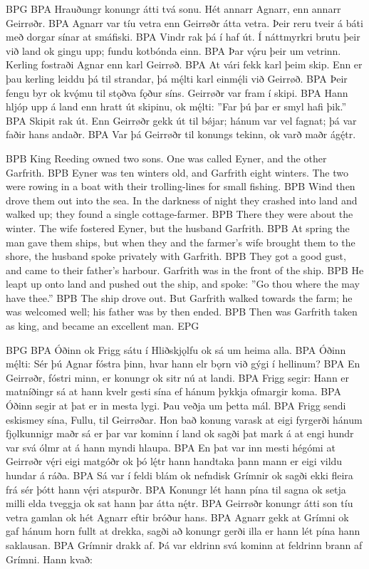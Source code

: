 BPG
BPA Hrauðungr konungr átti tvá sonu. Hét annarr Agnarr, enn annarr Geirrøðr.
BPA Agnarr var tíu vetra enn Geirrøðr átta vetra. Þeir reru tveir á báti með dorgar sínar at smáfiski.
BPA Vindr rak þá í haf út. Í náttmyrkri brutu þeir við land ok gingu upp; fundu kotbónda einn.
BPA Þar vǫ́ru þeir um vetrinn. Kerling fostraði Agnar enn karl Geirrøð.
BPA At vári fekk karl þeim skip. Enn er þau kerling leiddu þá til strandar, þá mę́lti karl einmę́li við Geirrøð.
BPA Þeir fengu byr ok kvǫ́mu til stǫðva fǫður síns. Geirrøðr var fram í skipi.
BPA Hann hljóp upp á land enn hratt út skipinu, ok mę́lti: ”Far þú þar er smyl hafi þik.”
BPA Skipit rak út. Enn Geirrøðr gekk út til bǿjar; hánum var vel fagnat; þá var faðir hans andaðr.
BPA Var þá Geirrøðr til konungs tekinn, ok varð maðr ágę́tr.

BPB King Reeding owned two sons. One was called Eyner, and the other Garfrith.
BPB Eyner was ten winters old, and Garfrith eight winters. The two were rowing in a boat with their trolling-lines for small fishing.
BPB Wind then drove them out into the sea. In the darkness of night they crashed into land and walked up; they found a single cottage-farmer.
BPB There they were about the winter. The wife fostered Eyner, but the husband Garfrith.
BPB At spring the man gave them ships, but when they and the farmer’s wife brought them to the shore, the husband spoke privately with Garfrith.
BPB They got a good gust, and came to their father’s harbour. Garfrith was in the front of the ship.
BPB He leapt up onto land and pushed out the ship, and spoke: ”Go thou where the  may have thee.”
BPB The ship drove out. But Garfrith walked towards the farm; he was welcomed well; his father was by then ended.
BPB Then was Garfrith taken as king, and became an excellent man.
EPG


BPG
BPA Óðinn ok Frigg sátu í Hliðskjǫlfu ok sá um heima alla.
BPA Óðinn mę́lti: Sér þú Agnar fóstra þinn, hvar hann elr bǫrn við gýgi í hellinum?
BPA En Geirrøðr, fóstri minn, er konungr ok sitr nú at landi.
BPA Frigg segir: Hann er matníðingr sá at hann kvelr gesti sína ef hánum þykkja ofmargir koma.
BPA Óðinn segir at þat er in mesta lygi. Þau veðja um þetta mál.
BPA Frigg sendi eskismey sína, Fullu, til Geirrøðar. Hon bað konung varask at eigi fyrgerði hánum fjǫlkunnigr maðr sá er þar var kominn í land ok sagði þat mark á at engi hundr var svá ólmr at á hann myndi hlaupa.
BPA En þat var inn mesti hégómi at Geirrøðr vę́ri eigi matgóðr ok þó lę́tr hann handtaka þann mann er eigi vildu hundar á ráða.
BPA Sá var í feldi blám ok nefndisk Grímnir ok sagði ekki fleira frá sér þótt hann vę́ri atspurðr.
BPA Konungr lét hann pína til sagna ok setja milli elda tveggja ok sat hann þar átta nę́tr.
BPA Geirrøðr konungr átti son tíu vetra gamlan ok hét Agnarr eftir bróður hans.
BPA Agnarr gekk at Grímni ok gaf hánum horn fullt at drekka, sagði að konungr gerði illa er hann lét pína hann saklausan.
BPA Grímnir drakk af. Þá var eldrinn svá kominn at feldrinn brann af Grímni. Hann kvað:

